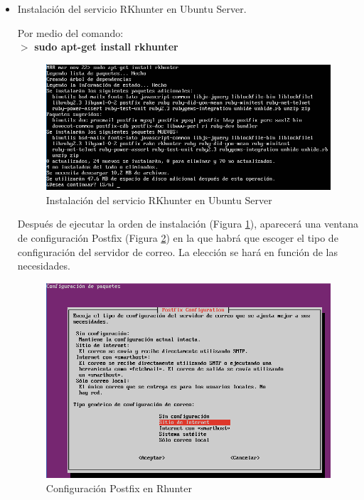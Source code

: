 \begin{itemize}
	
	\item Instalación del servicio RKhunter en Ubuntu Server.
	
	Por medio del comando:
	\\
	
	$ > $ \textbf{sudo apt-get install rkhunter}	
		
	\begin{figure}[H] %
		\centering
		\includegraphics[scale=0.6]{figuras/figura82.png} 
		\caption{Instalación del servicio RKhunter en Ubuntu Server} 
		\label{fig:figura82}
	\end{figure}

	Después de ejecutar la orden de instalación (Figura \ref{fig:figura82}), aparecerá una ventana de configuración Postfix (Figura \ref{fig:figura83})
	en la que habrá que escoger el tipo de configuración del servidor de correo. La elección se hará en función de las necesidades.
	
	\begin{figure}[H] %
		\centering
		\includegraphics[scale=0.5]{figuras/figura83.png} 
		\caption{Configuración Postfix en Rhunter} 
		\label{fig:figura83}
	\end{figure}


\end{itemize}
